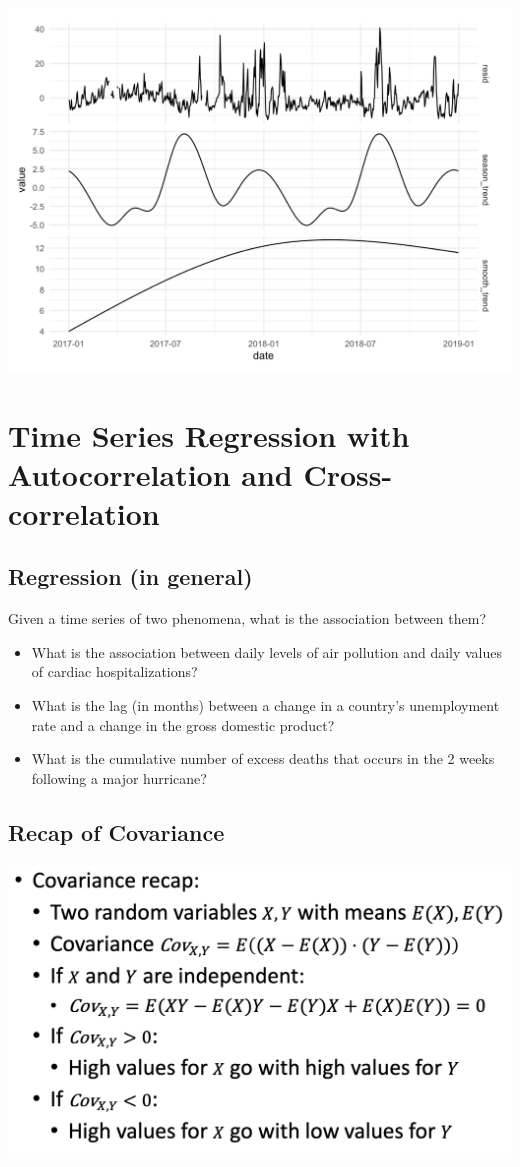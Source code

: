 \documentclass[11pt]{article}
\theoremstyle{definition}
\begin{document}
\includegraphics[width=\textwidth/2]{2.png}

\section{Time Series Regression with
Autocorrelation and
Cross-correlation}
\subsection{Regression (in general)}
Given a time series of two phenomena, what is the association
between them?

\begin{itemize}
  \item What is the association between daily levels of air pollution and daily
  values of cardiac hospitalizations?
  \item What is the lag (in months) between a change in a country’s
  unemployment rate and a change in the gross domestic product?
  \item What is the cumulative number of excess deaths that occurs in the 2
  weeks following a major hurricane?
\end{itemize}

\subsection{Recap of Covariance}
\includegraphics[width=\textwidth/2]{5.png}
\end{document}
